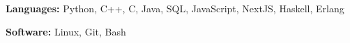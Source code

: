 \documentclass[10pt, letterpaper]{article}
\begin{document}
        \vspace{0.2 cm}

        \begin{onecolentry}
            \textbf{Languages:} Python, C++, C, Java, SQL, JavaScript, NextJS, Haskell, Erlang
        \end{onecolentry}

        \vspace{0.2 cm}

        \begin{onecolentry}
            \textbf{Software:} Linux, Git, Bash
        \end{onecolentry}



    
\end{document}
